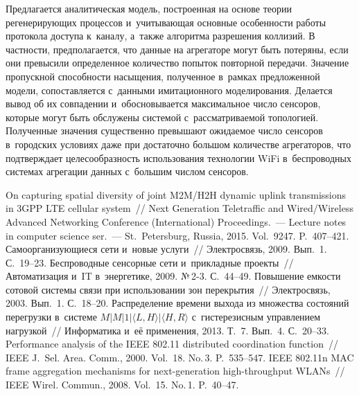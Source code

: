 \begin{multicols}{2}
Предлагается аналитическая модель, 
построенная на основе теории регенерирующих процессов 
и~учитывающая основные особенности работы протокола доступа к~каналу, 
а~также алгоритма разрешения коллизий. 
    В частности, предполагается, что данные на агрегаторе могут быть 
потеряны, если они превысили определенное количество попыток 
повторной передачи. Значение пропускной способности насыщения, 
полученное в~рамках предложенной модели, сопоставляется с~данными 
имитационного моделирования. Делается вывод об их совпадении 
и~обосновывается максимальное число сенсоров, которые могут быть 
обслужены системой с~рас\-смат\-ри\-ва\-емой топологией. Полученные 
значения существенно превышают ожидаемое число сенсоров 
в~городских условиях даже при достаточно большом количестве 
агрегаторов, что подтверждает целесообразность использования 
технологии WiFi в~беспроводных системах агрегации данных с~большим 
числом сенсоров.



{\small\frenchspacing
 {%
 \begin{thebibliography}{99}

 On capturing spatial diversity of joint 
M2M/H2H dynamic uplink transmissions in 3GPP LTE cellular system~// 
Next Generation Teletraffic and Wired/Wireless Advanced Networking 
Conference (International) Proceedings.~---  Lecture notes in computer 
science ser.~--- St.\ Petersburg, Russia, 2015. Vol.~9247. P.~407--421.
 Самоорганизующиеся сети и~новые услуги~// 
Электросвязь, 2009. Вып.~1. С.~19--23.
 Беспроводные сенсорные сети и~прикладные 
проекты~// Автоматизация и~IT в~энергетике, 2009. №\,2-3. С.~44--49.
 Повышение емкости сотовой системы 
связи при использовании зон перекрытия~// Электросвязь, 2003. Вып.~1. 
С.~18--20.
 Распределение времени выхода из множества состояний 
перегрузки в~системе $M|M|1|\langle L,H \rangle |\langle H,R \rangle$ 
с~гистерезисным управлением нагрузкой~// Информатика и~её 
применения, 2013. Т.~7. Вып.~4. С.~20--33.
 Performance analysis of the IEEE 802.11 distributed 
coordination function~// IEEE J.~Sel. Area. Comm., 2000. 
Vol.~18. No.\,3. P.~535--547.
 IEEE 802.11n MAC frame aggregation mechanisms for  
next-generation high-throughput WLANs~// IEEE Wirel. Commun., 
2008. Vol.~15. No.\,1. P.~40--47.


\end{thebibliography}}}
\end{multicols}
